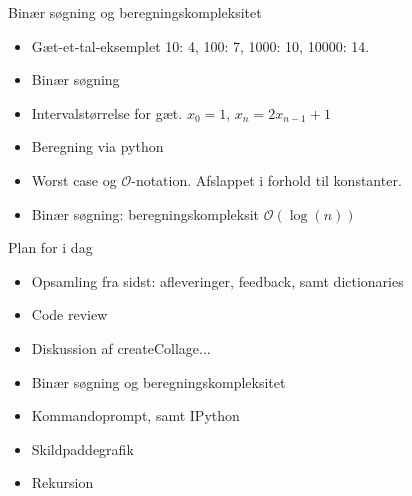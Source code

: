 \documentclass[a4paper,landscape]{slides}
\begin{document}
\begin{slide}
	\begin{center} {\large 
             Binær søgning og beregningskompleksitet
	} \end{center}
	\begin{itemize} \addtolength{\itemsep}{-\baselineskip}
                \item Gæt-et-tal-eksemplet 10: 4, 100: 7, 1000: 10, 10000: 14. 
                \item Binær søgning
                \item Intervalstørrelse for gæt. $x_0 = 1$,  $x_n = 2x_{n-1} + 1$
                \item Beregning via python
                \item Worst case og $\mathcal{O}$-notation. Afslappet i forhold til konstanter.
                \item Binær søgning: beregningskompleksit $\mathcal{O}(\log(n))$
	\end{itemize}
\end{slide}

\begin{slide}
	\begin{center} {\large 
            Plan for i dag
	} \end{center}
	\begin{itemize} \addtolength{\itemsep}{-\baselineskip}
		\item Opsamling fra sidst: afleveringer, feedback, samt dictionaries
                \item Code review
		\item Diskussion af createCollage...
                \item Binær søgning og beregningskompleksitet
		\item Kommandoprompt, samt IPython
		\item Skildpaddegrafik 
                \item Rekursion
	\end{itemize}
\end{slide}
\end{document}
